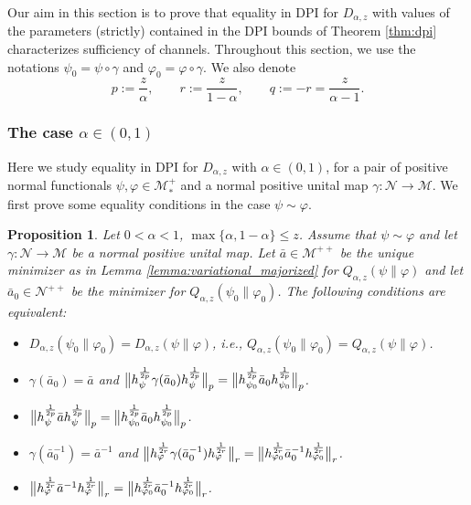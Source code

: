 \documentclass[12pt]{article}
\newtheorem{prop}[theorem]{Proposition}
\theoremstyle{definition}
\theoremstyle{remark}
\numberwithin{equation}{section}
\def\Me{\mathcal M}
\def\Ne{\mathcal N}
\def\ffi{\varphi}
\begin{document}
Our aim in this section is to prove that equality in DPI for $D_{\alpha,z}$ with 
values of the parameters (strictly) contained in the DPI bounds of Theorem \ref{thm:dpi}
characterizes sufficiency of channels. Throughout this section, we use the
notations $\psi_0=\psi\circ\gamma$ and $\ffi_0=\ffi\circ\gamma$. We also denote
\[
p:=\frac{z}{\alpha},\qquad r:=\frac{z}{1-\alpha},\qquad q:=-r=\frac{z}{\alpha-1}. 
\]






\subsubsection{The case $\alpha\in (0,1)$}


Here we study equality in DPI for $D_{\alpha,z}$ with $\alpha\in (0,1)$,  for a pair of positive normal
functionals $\psi,\ffi\in \Me_*^+$ and a normal positive unital map $\gamma:\Ne\to \Me$. We first prove some equality conditions  in the case $\psi\sim \ffi$. 

\begin{prop}\label{prop:DPI_equality}
Let $0<\alpha<1$, $\max\{\alpha,1-\alpha\}\le z$.  Assume that $\psi\sim \ffi$ and  let
$\gamma:\Ne\to \Me$ be a normal positive unital map. Let 
$\bar a\in \Me^{++}$  
be the unique minimizer as in Lemma \ref{lemma:variational_majorized} for
$Q_{\alpha,z}(\psi\|\ffi)$ and let $\bar a_0\in \Ne^{++}$ be the minimizer for
$Q_{\alpha,z}(\psi_0\|\ffi_0)$. The following conditions are equivalent:
\begin{itemize}
\item[(i)] $D_{\alpha,z}(\psi_0\|\ffi_0)=D_{\alpha,z}(\psi\|\ffi)$, i.e.,
$Q_{\alpha,z}(\psi_0\|\ffi_0)=Q_{\alpha,z}(\psi\|\ffi)$.
\item[(ii)] $\gamma(\bar a_0)=\bar a$ and
$\big\|h_\psi^{1\over2p}\gamma(\bar a_0)h_\psi^{1\over2p}\big\|_{p}
=\big\|h_{\psi_0}^{1\over2p}\bar a_0h_{\psi_0}^{1\over2p}\big\|_{p}$.
\item[(iii)] $\big\|h_\psi^{1\over2p}\bar ah_\psi^{1\over2p}\big\|_{p}
=\big\|h_{\psi_0}^{1\over2p}\bar a_0h_{\psi_0}^{1\over2p}\big\|_{p}$.
\item[(iv)] $\gamma(\bar a_0^{-1})=\bar a^{-1}$ and
$\big\|h_\ffi^{1\over2r}\gamma(\bar a_0^{-1})h_\ffi^{1\over2r}\big\|_{r}
=\big\|h_{\ffi_0}^{1\over2r}\bar a_0^{-1}h_{\ffi_0}^{1\over2r}\big\|_{r}$.
\item[(v)] $\big\|h_\ffi^{1\over2r}\bar a^{-1}h_\ffi^{1\over2r}\big\|_{r}
=\big\|h_{\ffi_0}^{1\over2r}\bar a_0^{-1}h_{\ffi_0}^{1\over2r}\big\|_{r}$.
\end{itemize}
\end{prop}
\end{document}
